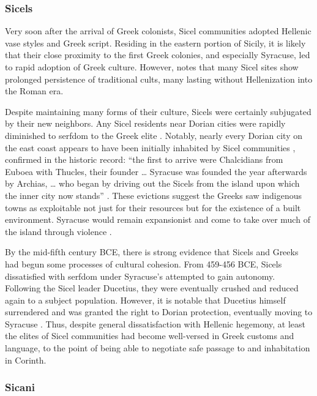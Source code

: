 \documentclass{../../../coursework}
\begin{document}
\subsubsection{Sicels}

Very soon after the arrival of Greek colonists, Sicel communities adopted
Hellenic vase styles and Greek script. Residing in the eastern portion of
Sicily, it is likely that their close proximity to the first Greek colonies,
and especially Syracuse, led to rapid adoption of Greek culture. However,
\textcite{Hol91} notes that many Sicel sites show prolonged persistence of
traditional cults, many lasting without Hellenization into the Roman era.

Despite maintaining many forms of their culture, Sicels were certainly
subjugated by their new neighbors. Any Sicel residents near Dorian cities were
rapidly diminished to serfdom to the Greek elite \parencite{Fin83}. Notably,
nearly every Dorian city on the east coast appears to have been initially
inhabited by Sicel communities \parencite{Boa80}, confirmed in the historic
record: ``the first to arrive were Chalcidians from Euboea with Thucles, their
founder … Syracuse was founded the year afterwards by Archias, … who began by
driving out the Sicels from the island upon which the inner city now stands''
\parencite[VI.3]{Thucydides}. These evictions suggest the Greeks saw
indigenous towns as exploitable not just for their resources but for the
existence of a built environment. Syracuse would remain expansionist and come
to take over much of the island through violence \parencite{Sjo73}.

By the mid-fifth century BCE, there is strong evidence that Sicels and Greeks
had begun some processes of cultural cohesion. From 459-456 BCE, Sicels
dissatisfied with serfdom under Syracuse's attempted to gain autonomy.
Following the Sicel leader Ducetius, they were eventually crushed and reduced
again to a subject population. However, it is notable that Ducetius himself
surrendered and was granted the right to Dorian protection, eventually moving
to Syracuse \parencite{Hol91}. Thus, despite general dissatisfaction with
Hellenic hegemony, at least the elites of Sicel communities had become
well-versed in Greek customs and language, to the point of being able to
negotiate safe passage to and inhabitation in Corinth.

\subsubsection{Sicani}
\end{document}

